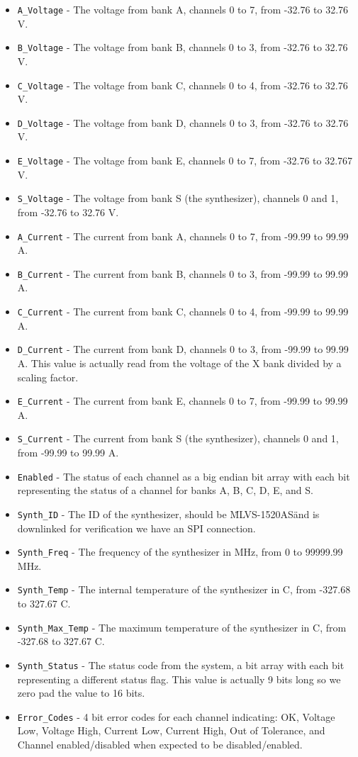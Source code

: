 \begin{itemize}
    \item \texttt{A\_Voltage} - The voltage from bank A, channels 0 to 7, from -32.76 to 32.76 V.
    \item \texttt{B\_Voltage} - The voltage from bank B, channels 0 to 3, from -32.76 to 32.76 V.
    \item \texttt{C\_Voltage} - The voltage from bank C, channels 0 to 4, from -32.76 to 32.76 V.
    \item \texttt{D\_Voltage} - The voltage from bank D, channels 0 to 3, from -32.76 to 32.76 V.
    \item \texttt{E\_Voltage} - The voltage from bank E, channels 0 to 7, from -32.76 to 32.767 V.
    \item \texttt{S\_Voltage} - The voltage from bank S (the synthesizer), channels 0 and 1, from -32.76 to 32.76 V.
    \item \texttt{A\_Current} - The current from bank A, channels 0 to 7, from -99.99 to 99.99 A.
    \item \texttt{B\_Current} - The current from bank B, channels 0 to 3, from -99.99 to 99.99 A.
    \item \texttt{C\_Current} - The current from bank C, channels 0 to 4, from -99.99 to 99.99 A.
    \item \texttt{D\_Current} - The current from bank D, channels 0 to 3, from -99.99 to 99.99 A. This value is actually read from the voltage of the X bank divided by a scaling factor. 
    \item \texttt{E\_Current} - The current from bank E, channels 0 to 7, from -99.99 to 99.99 A.
    \item \texttt{S\_Current} - The current from bank S (the synthesizer), channels 0 and 1, from -99.99 to 99.99 A.
    \item \texttt{Enabled} - The status of each channel as a big endian bit array with each bit representing the status of a channel for banks A, B, C, D, E, and S.
    \item \texttt{Synth\_ID} - The ID of the synthesizer, should be \"MLVS-1520AS\" and is downlinked for verification we have an SPI connection.
    \item \texttt{Synth\_Freq} - The frequency of the synthesizer in MHz, from 0 to 99999.99 MHz.
    \item \texttt{Synth\_Temp} - The internal temperature of the synthesizer in C, from -327.68 to 327.67 C.
    \item \texttt{Synth\_Max\_Temp} - The maximum temperature of the synthesizer in C, from -327.68 to 327.67 C.
    \item \texttt{Synth\_Status} - The status code from the system, a bit array with each bit representing a different status flag. This value is actually 9 bits long so we zero pad the value to 16 bits.
    \item \texttt{Error\_Codes} - 4 bit error codes for each channel indicating: OK, Voltage Low, Voltage High, Current Low, Current High, Out of Tolerance, and Channel enabled/disabled when expected to be disabled/enabled.
\end{itemize}
